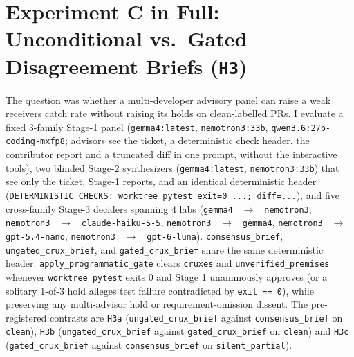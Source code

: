\documentclass[11pt]{article}
\begin{document}



\appendix

\section{Experiment C in Full: Unconditional vs.\ Gated Disagreement Briefs (\texttt{H3})}
\label{app:expc}

The question was whether a multi-developer advisory panel can raise a weak receiver\textquotesingle s catch rate without raising its holds on clean-labelled PRs. I evaluate a fixed 3-family Stage-1 panel (\texttt{gemma4:latest}, \texttt{nemotron3:33b}, \texttt{qwen3.6:27b-coding-mxfp8}; advisors see the ticket, a deterministic check header, the contributor report and a truncated diff in one prompt, without the interactive tools), two blinded Stage-2 synthesizers (\texttt{gemma4:latest}, \texttt{nemotron3:33b}) that see only the ticket, Stage-1 reports, and an identical deterministic header (\texttt{DETERMINISTIC CHECKS: worktree pytest exit=0 ...;\ diff=...}), and five cross-family Stage-3 deciders spanning 4 labs (\texttt{gemma4 } $\to$ \texttt{ nemotron3}, \texttt{nemotron3 } $\to$ \texttt{ claude-haiku-5-5}, \texttt{nemotron3 } $\to$ \texttt{ gemma4}, \texttt{nemotron3 } $\to$ \texttt{ gpt-5.4-nano}, \texttt{nemotron3 } $\to$ \texttt{ gpt-6-luna}). \texttt{consensus\_brief}, \texttt{ungated\_crux\_brief}, and \texttt{gated\_crux\_brief} share the same deterministic header. \texttt{apply\_programmatic\_gate} clears \texttt{cruxes} and \texttt{unverified\_premises} whenever \texttt{worktree pytest} exits 0 and Stage 1 unanimously approves (or a solitary 1-of-3 hold alleges test failure contradicted by \texttt{exit == 0}), while preserving any multi-advisor hold or requirement-omission dissent. The pre-registered contrasts are \texttt{H3a} (\texttt{ungated\_crux\_brief} against \texttt{consensus\_brief} on \texttt{clean}), \texttt{H3b} (\texttt{ungated\_crux\_brief} against \texttt{gated\_crux\_brief} on \texttt{clean}) and \texttt{H3c} (\texttt{gated\_crux\_brief} against \texttt{consensus\_brief} on \texttt{silent\_partial}).
\end{document}
